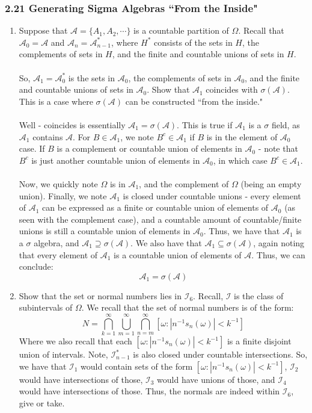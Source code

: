 \documentclass[12pt,a4paper]{article}
\newcommand{\1}[1]{\mathbbm{1}\left\{ #1 \right\}}
\newcommand{\acal}{\mathcal{A}}
\newcommand{\ical}{\mathcal{I}}
\begin{document}
\subsubsection{2.21 Generating Sigma Algebras ``From the Inside"}
\begin{enumerate}
	\item Suppose that $\acal = \{A_1, A_2, \cdots\}$ is a countable partition of $\Omega$. Recall that $\acal_0 = \acal$ and $\acal_n = \acal_{n-1}^*$, where $H^*$ consists of the sets in $H$, the complements of sets in $H$, and the finite and countable unions of sets in $H$.
	\\\\
	So, $\acal_1 = \acal_0^*$ is the sets in $\acal_0$, the complements of sets in $\acal_0$, and the finite and countable unions of sets in $\acal_0$. Show that $\acal_1$ coincides with $\sigma(\acal)$. This is a case where $\sigma(\acal)$ can be constructed ``from the inside."
	\\\\
	Well - coincides is essentially $\acal_1 = \sigma(\acal)$. This is true if $\acal_1$ is a $\sigma$ field, as $\acal_1$ contains $\acal$. For $B \in \acal_1$, we note $B^c \in \acal_1$ if $B$ is in the element of $\acal_0$ case. If $B$ is a complement or countable union of elements in $\acal_0$ - note that $B^c$ is just another countable union of elements in $\acal_0$, in which case $B^c \in \acal_1$.
	\\\\
	Now, we quickly note $\Omega$ is in $\acal_1$, and the complement of $\Omega$ (being an empty union). Finally, we note $\acal_1$ is closed under countable unions - every element of $\acal_1$ can be expressed as a finite or countable union of elements of $\acal_0$ (as seen with the complement case), and a countable amount of countable/finite unions is still a countable union of elements in $\acal_0$. Thus, we have that $\acal_1$ is a $\sigma$ algebra, and $\acal_1 \supseteq \sigma(\acal)$. We also have that $\acal_1 \subseteq \sigma(\acal)$, again noting that every element of $\acal_1$ is a countable union of elements of $\acal$. Thus, we can conclude:
	$$
		\acal_1 = \sigma(\acal)
	$$
	
	\item Show that the set or normal numbers lies in $\ical_6$. Recall, $\ical$ is the class of subintervals of $\Omega$. We recall that the set of normal numbers is of the form:
	$$
		N = \bigcap_{k=1}^\infty \bigcup_{m=1}^\infty \bigcap_{n = m}^\infty 
		\left[\omega : |n^{-1}s_n(\omega)| < k^{-1}\right]
	$$
	Where we also recall that each $\left[\omega : |n^{-1}s_n(\omega)| < k^{-1}\right]$ is a finite disjoint union of intervals. Note, $\ical_{n-1}^*$ is also closed under countable intersections. So, we have that $\ical_1$ would contain sets of the form $\left[\omega : |n^{-1}s_n(\omega)| < k^{-1}\right]$, $\ical_2$ would have intersections of those, $\ical_3$ would have unions of those, and $\ical_4$ would have intersections of those. Thus, the normals are indeed within $\ical_6$, give or take. 
	

\end{enumerate}
\end{document}
